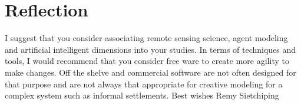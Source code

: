 
\chapter{Reflection} %

\label{Chapter5} %

I suggest that you consider associating remote sensing science, agent modeling  and artificial intelligent dimensions into your studies. In terms of techniques and tools, I would recommend that you consider free ware to create more agility to make changes. Off the shelve and commercial software are not often designed for that purpose and are not always that appropriate for creative modeling for a complex system such as informal settlements. 
Best wishes
Remy Sietchiping